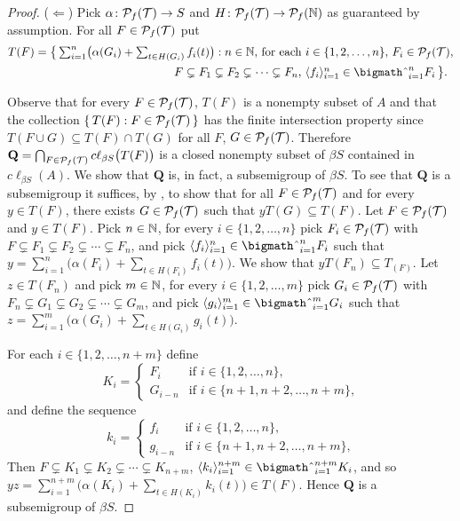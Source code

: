 \begin{proof}
  ($\Leftarrow$)
  Pick $\alpha \colon \mathcal{P}_f(\mathcal{T}) \to S$ and $H \colon \mathcal{P}_f(\mathcal{T}) \to \mathcal{P}_f(\mathbb{N})$ as guaranteed by assumption.
  For all $F \in \mathcal{P}_f(\mathcal{T})$ put
  \begin{align*}
    T(F) &= \bigl\{\, \textstyle \sum_{i=1}^n \bigl( \alpha(G_i) + \sum_{t \in H(G_i)} f_i(t)\bigr) : \mbox{$n \in \bbN$, for each $i \in \{1, 2, \ldots, n\}$, $F_i \in \Pf(\calT)$,}\\
 &\hspace{12em}\mbox{$F \subsetneq F_1 \subsetneq F_2 \subsetneq \cdots \subsetneq F_n$, $\la f_i \ra_{i=1}^n \in \bigtimes_{i=1}^n F_i$} \,\bigr\}.
  \end{align*}

  Observe that for every $F \in \mathcal{P}_f(\mathcal{T})$, $T(F)$ is a nonempty subset of $A$ and that the collection $\{\, T(F) : F \in \mathcal{P}_f(\mathcal{T}) \,\}$ has the finite intersection property since $T(F \cup G) \subseteq T(F) \cap T(G)$ for all $F$, $G \in \mathcal{P}_f(\mathcal{T})$.
  Therefore $\mathbf{Q} = \bigcap_{F \in \mathcal{P}_f(\mathcal{T})} c\ell_{\beta S}\bigl(T(F)\bigr)$ is a closed nonempty subset of $\beta S$ contained in $c\ell_{\beta S}(A)$. 
  We show that $\mathbf{Q}$ is, in fact, a subsemigroup of $\beta S$. 
  To see that $\mathbf{Q}$ is a subsemigroup it suffices, by \cite[Theorem 4.20]{Hindman:1998fk}, to show that for all $F \in \mathcal{P}_f(\mathcal{T})$ and for every $y \in T(F)$, there exists $G \in \mathcal{P}_f(\mathcal{T})$ such that $yT(G) \subseteq T(F)$. 
  Let $F \in \mathcal{P}_f(\mathcal{T})$ and $y \in T(F)$. 
  Pick $n \in \mathbb{N}$, for every $i \in \{1, 2, \ldots, n\}$ pick $F_i \in \mathcal{P}_f(\mathcal{T})$ with $F \subsetneq F_1 \subsetneq F_2 \subsetneq \cdots \subsetneq F_n$, and pick $\la f_i \ra_{i=1}^n \in \bigtimes_{i=1}^n F_i$ such that $y = \sum_{i=1}^n \bigl( \alpha(F_i) + \sum_{t \in H(F_i)} f_i(t) \bigr)$.
  We show that $yT(F_n) \subseteq T_(F)$. 
  Let $z \in T(F_n)$ and pick $m \in \mathbb{N}$, for every $i \in \{1, 2, \ldots, m\}$ pick $G_i \in \mathcal{P}_f(\mathcal{T})$ with $F_n \subsetneq G_1 \subsetneq G_2 \subsetneq \cdots \subsetneq G_m$, and pick $\la g_i \ra_{i=1}^m \in \bigtimes_{i=1}^m G_i$ such that $z = \sum_{i=1}^m \bigl( \alpha(G_i) + \sum_{t \in H(G_i)} g_i(t) \bigr)$.

  For each $i \in \{1, 2, \ldots, n+m\}$ define
  \[
    K_i =
    \begin{cases}
      F_i & \mbox{if $i \in \{1, 2, \ldots, n\}$,} \\
      G_{i-n} & \mbox{if $i \in \{n+1, n+2, \ldots, n+m\}$,}
    \end{cases}
  \]
  and define the sequence
  \[
    k_i =
    \begin{cases}
      f_i & \mbox{if $i \in \{1, 2, \ldots, n\}$,} \\
      g_{i-n} & \mbox{if $i \in \{n+1, n+2, \ldots, n+m\}$,}
    \end{cases}
  \]
  Then $F \subsetneq K_1 \subsetneq K_2 \subsetneq \cdots \subsetneq K_{n+m}$, $\la k_i \ra_{i=1}^{n+m} \in \bigtimes_{i=1}^{n+m} K_i$, and so $yz = \sum_{i=1}^{n+m}\bigl( \alpha(K_i) + \sum_{t \in H(K_i)} k_i(t) \bigr) \in T(F)$.
  Hence $\mathbf{Q}$ is a subsemigroup of $\beta S$.


\end{proof}
